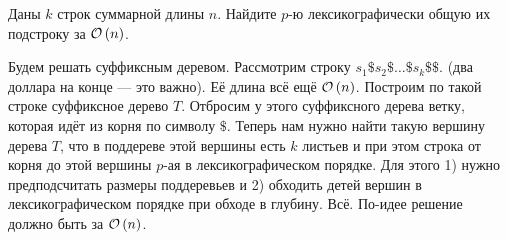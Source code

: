 \begin{task}[5]
Даны $k$ строк суммарной длины $n$. Найдите $p$-ю лексикографически общую их подстроку за $\mathcal{O}\left(n\right)$.
\end{task}
\begin{solution}
Будем решать суффиксным деревом. Рассмотрим строку $s_1 \$ s_2 \$ \ldots \$ s_k \$ \$ $. (два доллара на конце --- это важно). Её длина всё ещё $\mathcal{O}\left(n\right)$. Построим по такой строке суффиксное дерево $T$. Отбросим у этого суффиксного дерева ветку, которая идёт из корня по символу $\$$. Теперь нам нужно найти такую вершину дерева $T$, что в поддереве этой вершины есть $k$ листьев и при этом строка от корня до этой вершины $p$-ая в лексикографическом порядке. Для этого 1) нужно предподсчитать размеры поддеревьев и 2) обходить детей вершин в лексикографическом порядке при обходе в глубину. Всё. По-идее решение должно быть за $\mathcal{O}\left(n\right)$.
\end{solution}


